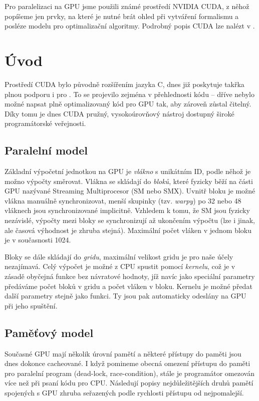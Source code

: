 
Pro paralelizaci na GPU jsme použili známé prostředí NVIDIA CUDA, z něhož popíšeme jen prvky, na které je nutné brát ohled při vytváření formalismu a posléze modelu pro optimalizační algoritmy. Podrobný popis CUDA lze nalézt v \cite{CUDA programming g.}.

\section{Úvod}

Prostředí CUDA bylo původně rozšířením jazyka C, dnes již poskytuje takřka plnou podporu i pro \Cpp. To se projevilo zejména v přehlednosti kódu -- dříve nebylo možné napsat plně optimalizovaný kód pro GPU tak, aby zároveň zůstal čitelný. Díky tomu je dnes CUDA pružný, vysokoúrovňový nástroj dostupný široké programátorské veřejnosti. 

\subsection{Paralelní model}\label{GPU par model}

Základní výpočetní jednotkou na GPU je \emph{vlákno} s unikátním ID, podle něhož je možno výpočty směrovat. Vlákna se skládají do \emph{bloků}, které fyzicky běží na části GPU nazývané Streaming Multiprocesor (SM nebo SMX). Uvnitř bloku je možné vlákna manuálně synchronizovat, menší skupinky (tzv. \emph{warpy}) po 32 nebo 48 vláknech jsou synchronizované implicitně. Vzhledem k tomu, že SM jsou fyzicky nezávislé, výpočty mezi bloky se synchronizují až ukončením výpočtu (lze i jinak, ale časová výhodnost je zhruba stejná). Maximální počet vláken v jednom bloku je v současnosti 1024.

Bloky se dále skládají do \emph{gridu}, maximální velikost gridu je pro naše účely nezajímavá. Celý výpočet je možné z CPU spustit pomocí \emph{kernelu}, což je v zásadě obyčejná funkce bez návratové hodnoty, jíž navíc jako speciální parametry předáváme počet bloků v gridu a počet vláken v bloku. Kernelu je možné předat další parametry stejně jako funkci. Ty jsou pak automaticky odeslány na GPU při jeho spuštění.

\subsection{Paměťový model}

Současné GPU mají několik úrovní pamětí a některé přístupy do paměti jsou dnes dokonce cacheované. I když pomineme obecná omezení přístupu do paměti pro paralelní program (dead-lock, race-condition), stále je programátor omezován více než při psaní kódu pro CPU. Následují popisy nejdůležitějších druhů pamětí spojených s GPU zhruba seřazených podle rychlosti přístupu od nejpomalejší.


